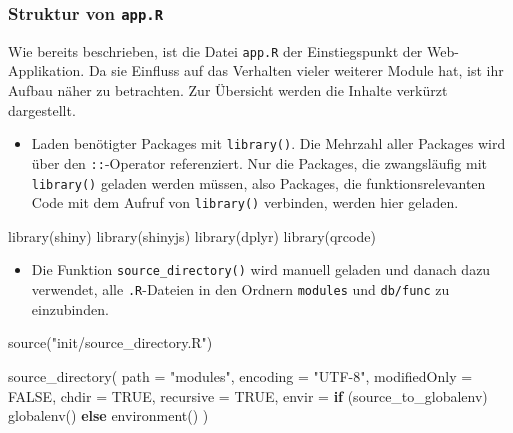 \documentclass[
]{article}
\newenvironment{Shaded}{\begin{snugshade}}{\end{snugshade}}
\newcommand{\AttributeTok}[1]{\textcolor[rgb]{0.77,0.63,0.00}{#1}}
\newcommand{\ConstantTok}[1]{\textcolor[rgb]{0.00,0.00,0.00}{#1}}
\newcommand{\ControlFlowTok}[1]{\textcolor[rgb]{0.13,0.29,0.53}{\textbf{#1}}}
\newcommand{\FunctionTok}[1]{\textcolor[rgb]{0.00,0.00,0.00}{#1}}
\newcommand{\NormalTok}[1]{#1}
\newcommand{\StringTok}[1]{\textcolor[rgb]{0.31,0.60,0.02}{#1}}
\providecommand{\tightlist}{%
  \setlength{\itemsep}{0pt}\setlength{\parskip}{0pt}}
\begin{document}
\hypertarget{struktur-von-app.r}{%
\subsubsection{\texorpdfstring{Struktur von \texttt{app.R}}{Struktur von app.R}}\label{struktur-von-app.r}}

Wie bereits beschrieben, ist die Datei \texttt{app.R} der Einstiegspunkt der Web-Applikation. Da sie Einfluss auf das Verhalten vieler weiterer Module hat, ist ihr Aufbau näher zu betrachten. Zur Übersicht werden die Inhalte verkürzt dargestellt.

\begin{itemize}
\tightlist
\item
  Laden benötigter Packages mit \texttt{library()}. Die Mehrzahl aller Packages wird über den \texttt{::}-Operator referenziert. Nur die Packages, die zwangsläufig mit \texttt{library()} geladen werden müssen, also Packages, die funktionsrelevanten Code mit dem Aufruf von \texttt{library()} verbinden, werden hier geladen.
\end{itemize}

\begin{Shaded}
\begin{Highlighting}[]
\FunctionTok{library}\NormalTok{(shiny)}
\FunctionTok{library}\NormalTok{(shinyjs)}
\FunctionTok{library}\NormalTok{(dplyr)}
\FunctionTok{library}\NormalTok{(qrcode)}
\end{Highlighting}
\end{Shaded}

\begin{itemize}
\tightlist
\item
  Die Funktion \texttt{source\_directory()} wird manuell geladen und danach dazu verwendet, alle \texttt{.R}-Dateien in den Ordnern \texttt{modules} und \texttt{db/func} zu einzubinden.
\end{itemize}

\begin{Shaded}
\begin{Highlighting}[]
\FunctionTok{source}\NormalTok{(}\StringTok{"init/source\_directory.R"}\NormalTok{)}

\FunctionTok{source\_directory}\NormalTok{(}
    \AttributeTok{path =} \StringTok{"modules"}\NormalTok{,}
    \AttributeTok{encoding =} \StringTok{"UTF{-}8"}\NormalTok{,}
    \AttributeTok{modifiedOnly =} \ConstantTok{FALSE}\NormalTok{,}
    \AttributeTok{chdir =} \ConstantTok{TRUE}\NormalTok{,}
    \AttributeTok{recursive =} \ConstantTok{TRUE}\NormalTok{,}
    \AttributeTok{envir =} \ControlFlowTok{if}\NormalTok{ (source\_to\_globalenv) }\FunctionTok{globalenv}\NormalTok{() }\ControlFlowTok{else} \FunctionTok{environment}\NormalTok{()}
\NormalTok{)}
\end{Highlighting}
\end{Shaded}
\end{document}
